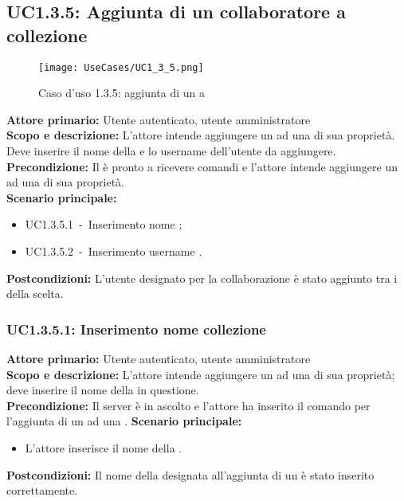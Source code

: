 \documentclass{scalatekids-article}
\begin{document}
\subsection{UC1.3.5: Aggiunta di un collaboratore a collezione}

\begin{figure}[H]
  \begin{center}
    \texttt{[image: UseCases/UC1\_3\_5.png]}
    \caption*{Caso d'uso 1.3.5: aggiunta di un  a }
  \end{center}
\end{figure}
\textbf{Attore primario:} Utente autenticato, utente amministratore\\
\textbf{Scopo e descrizione:} L'attore intende aggiungere un  ad una  di sua proprietà. Deve inserire il nome della  e lo username dell'utente da aggiungere.\\
\textbf{Precondizione:} Il  è pronto a ricevere comandi e l'attore intende aggiungere un  ad una  di sua proprietà.\\
\textbf{Scenario principale:}
\begin{itemize}
\item UC1.3.5.1\ -\ Inserimento nome ;
\item UC1.3.5.2\ -\ Inserimento username .
\end{itemize}
\textbf{Postcondizioni:} L'utente designato per la collaborazione è stato aggiunto tra i  della  scelta.

\subsubsection{UC1.3.5.1: Inserimento nome collezione}

\textbf{Attore primario:} Utente autenticato, utente amministratore\\
\textbf{Scopo e descrizione:} L'attore intende aggiungere un  ad una  di sua proprietà; deve inserire il nome della  in questione.\\
\textbf{Precondizione:} Il server è in ascolto e l'attore ha inserito il comando per l'aggiunta di un  ad una .
\textbf{Scenario principale:}
\begin{itemize}
\item L'attore inserisce il nome della .
\end{itemize}
\textbf{Postcondizioni:} Il nome della  designata all'aggiunta di un  è stato inserito correttamente.
\end{document}
